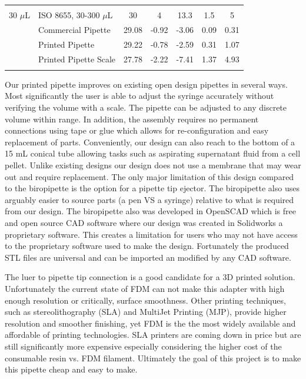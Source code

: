 \documentclass[10pt,letterpaper]{article}
\begin{document}
\begin{table}[!ht]
\begin{adjustwidth}{-2.25in}{0in}
\begin{tabular}{llccccc}
			&                       &        &                  &              &              &               \\
			30 $\mu$L  & ISO 8655, 30-300 $\mu$L   & 30     & 4                & 13.3         & 1.5          & 5             \\
			& Commercial Pipette    & 29.08  & -0.92            & -3.06        & 0.09         & 0.31          \\
			& Printed Pipette       & 29.22  & -0.78            & -2.59        & 0.31         & 1.07          \\
			& Printed Pipette Scale & 27.78  & -2.22            & -7.41        & 1.37         & 4.93          \\
			&                       &        &                  &              &              &               \\         
		\end{tabular}
	\end{adjustwidth}
\end{table}

Our printed pipette improves on existing open design pipettes in several ways. 
Most significantly the user is able to adjust the syringe accurately without verifying the volume with a scale.
The pipette can be adjusted to any discrete volume within range.
In addition, the assembly requires no permanent connections using tape or glue which allows for re-configuration and easy replacement of parts.
Conveniently, our design can also reach to the bottom of a 15 mL conical tube allowing tasks such as aspirating supernatant fluid from a cell pellet.
Unlike existing designs our design does not use a membrane that may wear out and require replacement.
The only major limitation of this design compared to the biropipette is the option for a pipette tip ejector.
The biropipette also uses arguably easier to source parts (a pen VS a syringe) relative to what is required from our design.
The biropipette also was developed in OpenSCAD which is free and open source CAD software where our design was created in Solidworks a proprietary software.
This creates a limitation for users who may not have access to the proprietary software used to make the design.
Fortunately the produced STL files are universal and can be imported an modified by any CAD software.

The luer to pipette tip connection is a good candidate for a 3D printed solution.
Unfortunately the current state of FDM can not make this adapter with high enough resolution or critically, surface smoothness.
Other printing techniques, such as stereolithography (SLA) and MultiJet Printing (MJP), provide higher resolution and smoother finishing, yet FDM is the the most widely available and affordable of printing technologies.
SLA printers are coming down in price but are still significantly more expensive especially considering the higher cost of the consumable resin vs. FDM filament.
Ultimately the goal of this project is to make this pipette cheap and easy to make.
\end{document}
